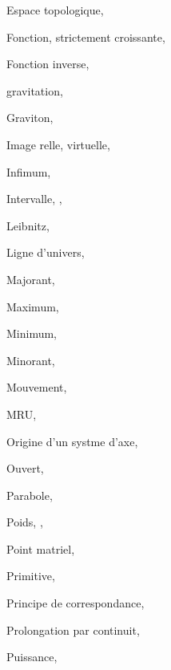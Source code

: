 \documentclass[a4paper,12pt]{book}
\theoremstyle{mes_exemples}	\newtheorem{exemple}[numtho]{Exemple}
\theoremstyle{mes_tho}
\begin{document}
\begin{theindex}
  \item Espace topologique, 

  \indexspace

  \item Fonction, 
    \subitem strictement croissante, 
  \item Fonction inverse, 

  \indexspace

  \item gravitation, 
  \item Graviton, 

  \indexspace

  \item Image
    \subitem relle, 
    \subitem virtuelle, 
  \item Infimum, 
  \item Intervalle, , 

  \indexspace

  \item Leibnitz, 
  \item Ligne d'univers, 

  \indexspace

  \item Majorant, 
  \item Maximum, 
  \item Minimum, 
  \item Minorant, 
  \item Mouvement, 
  \item MRU, 

  \indexspace

  \item Origine
    \subitem d'un systme d'axe, 
  \item Ouvert, 

  \indexspace

  \item Parabole, 
  \item Poids, , 
  \item Point matriel, 
  \item Primitive, 
  \item Principe de correspondance, 
  \item Prolongation par continuit, 
  \item Puissance, 


\end{theindex}
\end{document}
